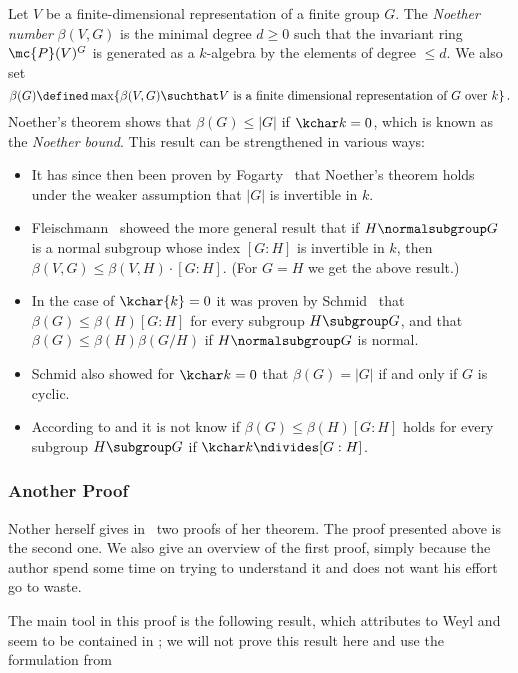 \begin{remark}
  \label{remark: Noether bound}
  Let $V$ be a finite-dimensional representation of a finite group $G$.
  The \emph{Noether number} $\beta(V,G)$ is the minimal degree $d \geq 0$ such that the invariant ring $\mc{P}(V)^G$ is generated as a $k$-algebra by the elements of degree $\leq d$.
  We also set
  \[
              \beta(G)
    \defined  \max \{ \beta(V,G) \suchthat \text{$V$ is a finite dimensional representation of $G$ over $k$} \} \,.
  \]
  Noether’s theorem shows that $\beta(G) \leq |G|$ if $\kchar k = 0$, which is known as the \emph{Noether bound}.
  This result can be strengthened in various ways:
  \begin{itemize}
    \item
      It has since then been proven by Fogarty~\cite{Fogarty2001} that Noether’s theorem holds under the weaker assumption that $|G|$ is invertible in $k$.
    \item
      Fleischmann~\cite{Fleischmann2000} showeed the more general result that if $H \normalsubgroup G$ is a normal subgroup whose index $[G : H]$ is invertible in $k$, then $\beta(V,G) \leq \beta(V,H) \cdot [G : H]$.
      (For $G = H$ we get the above result.)
    \item
      In the case of $\kchar{k} = 0$ it was proven by Schmid~\cite{Schmid1991} that $\beta(G) \leq \beta(H)[G : H]$ for every subgroup $H \subgroup G$, and that $\beta(G) \leq \beta(H)\beta(G/H)$ if $H \normalsubgroup G$ is normal.
    \item
      Schmid also showed for $\kchar k = 0$ that $\beta(G) = |G|$ if and only if $G$ is cyclic.
    \item
      According to \cite[Remark 3.6]{Wehlau2006} and \cite[Remark 3.2.5]{Derksen2015} it is not know if $\beta(G) \leq \beta(H)[G : H]$ holds for every subgroup $H \subgroup G$ if $\kchar k \ndivides [G : H]$. 
  \end{itemize}
\end{remark}



\subsubsection*{Another Proof}


\begin{fluff}
  Nother herself gives in~\cite{Noether1915} two proofs of her theorem.
  The proof presented above is the second one.
  We also give an overview of the first proof, simply because the author spend some time on trying to understand it and does not want his effort go to waste.
  
  The main tool in this proof is the following result, which \cite{Fleischmann2000} attributes to Weyl and seem to be contained in \cite[II.3]{Weyl1946};
  we will not prove this result here and use the formulation from \cite{Fleischmann2000}
\end{fluff}


